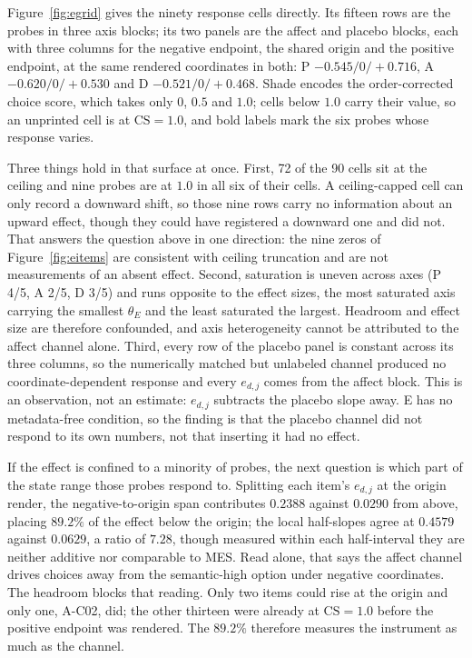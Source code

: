 \documentclass[sigconf]{acmart}
\begin{document}
Figure~\ref{fig:egrid} gives the ninety response cells directly. Its fifteen rows are the probes in three axis blocks; its two panels are the affect and placebo blocks, each with three columns for the negative endpoint, the shared origin and the positive endpoint, at the same rendered coordinates in both: P $-0.545/0/+0.716$, A $-0.620/0/+0.530$ and D $-0.521/0/+0.468$. Shade encodes the order-corrected choice score, which takes only $0$, $0.5$ and $1.0$; cells below $1.0$ carry their value, so an unprinted cell is at $\mathrm{CS}{=}1.0$, and bold labels mark the six probes whose response varies.

Three things hold in that surface at once. First, 72 of the 90 cells sit at the ceiling and nine probes are at $1.0$ in all six of their cells. A ceiling-capped cell can only record a downward shift, so those nine rows carry no information about an upward effect, though they could have registered a downward one and did not. That answers the question above in one direction: the nine zeros of Figure~\ref{fig:eitems} are consistent with ceiling truncation and are not measurements of an absent effect. Second, saturation is uneven across axes (P 4/5, A 2/5, D 3/5) and runs opposite to the effect sizes, the most saturated axis carrying the smallest $\theta_E$ and the least saturated the largest. Headroom and effect size are therefore confounded, and axis heterogeneity cannot be attributed to the affect channel alone. Third, every row of the placebo panel is constant across its three columns, so the numerically matched but unlabeled channel produced no coordinate-dependent response and every $e_{d,j}$ comes from the affect block. This is an observation, not an estimate: $e_{d,j}$ subtracts the placebo slope away. E has no metadata-free condition, so the finding is that the placebo channel did not respond to its own numbers, not that inserting it had no effect.

If the effect is confined to a minority of probes, the next question is which part of the state range those probes respond to. Splitting each item's $e_{d,j}$ at the origin render, the negative-to-origin span contributes $0.2388$ against $0.0290$ from above, placing $89.2\%$ of the effect below the origin; the local half-slopes agree at $0.4579$ against $0.0629$, a ratio of $7.28$, though measured within each half-interval they are neither additive nor comparable to MES. Read alone, that says the affect channel drives choices away from the semantic-high option under negative coordinates. The headroom blocks that reading. Only two items could rise at the origin and only one, A-C02, did; the other thirteen were already at $\mathrm{CS}{=}1.0$ before the positive endpoint was rendered. The $89.2\%$ therefore measures the instrument as much as the channel.
\end{document}
